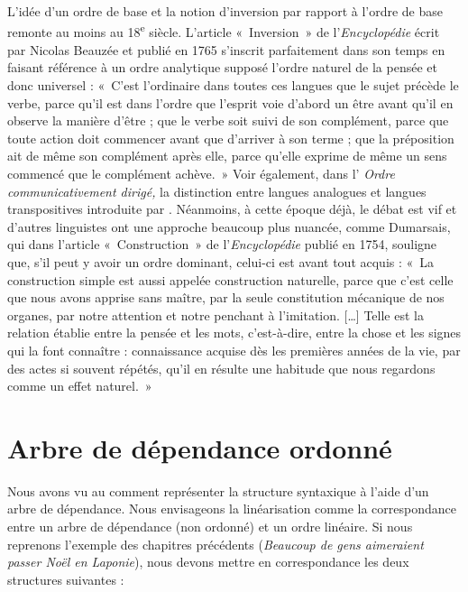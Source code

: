 {    L’idée d’un ordre de base et la notion d’inversion par rapport à l’ordre de base remonte au moins au 18\textsuperscript{e} siècle. L’article «~Inversion~» de l’\textit{Encyclopédie} écrit par Nicolas Beauzée et publié en 1765 s’inscrit parfaitement dans son temps en faisant référence à un ordre analytique supposé l’ordre naturel de la pensée et donc universel : «~C’est l’ordinaire dans toutes ces langues que le sujet précède le verbe, parce qu’il est dans l’ordre que l’esprit voie d’abord un être avant qu’il en observe la manière d’être ; que le verbe soit suivi de son complément, parce que toute action doit commencer avant que d’arriver à son terme ; que la préposition ait de même son complément après elle, parce qu’elle exprime de même un sens commencé que le complément achève.~» Voir également, dans l’ \textit{Ordre communicativement dirigé,} la distinction entre langues analogues et langues transpositives introduite par \citet{girad1747vrais}. Néanmoins, à cette époque déjà, le débat est vif et d’autres linguistes ont une approche beaucoup plus nuancée, comme Dumarsais, qui dans l’article «~Construction~» de l’\textit{Encyclopédie} publié en 1754, souligne que, s’il peut y avoir un ordre dominant, celui-ci est avant tout acquis : «~La construction simple est aussi appelée construction naturelle, parce que c’est celle que nous avons apprise sans maître, par la seule constitution mécanique de nos organes, par notre attention et notre penchant à l’imitation. […] Telle est la relation établie entre la pensée et les mots, c’est-à-dire, entre la chose et les signes qui la font connaître : connaissance acquise dès les premières années de la vie, par des actes si souvent répétés, qu’il en résulte une habitude que nous regardons comme un effet naturel.~»
}
\section{Arbre de dépendance ordonné}\label{sec:3.5.9}

Nous avons vu au  comment représenter la structure syntaxique à l’aide d’un arbre de dépendance. Nous envisageons la linéarisation comme la correspondance entre un arbre de dépendance (non ordonné) et un ordre linéaire. Si nous reprenons l’exemple des chapitres précédents (\textit{Beaucoup de gens aimeraient passer Noël en Laponie}), nous devons mettre en correspondance les deux structures suivantes :

